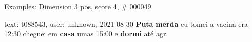 \begin{frame}{Examples: Dimension 3 pos, score 4, \# 000049}
\footnotesize
\begin{exampleblock}{text: t088543, user: unknown, 2021-08-30}
\textbf{Puta} \textbf{merda} eu tomei a vacina era 12:30 cheguei em 
\textbf{casa} umas 15:00 e \textbf{dormi} até agr. 
\end{exampleblock}
\end{frame}
